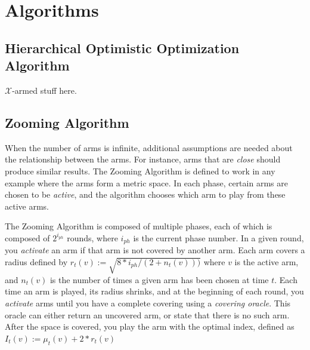 \section{Algorithms}
\subsection{Hierarchical Optimistic Optimization Algorithm}
$\mathcal{X}$-armed stuff here.

\subsection{Zooming Algorithm}
When the number of arms is infinite, additional assumptions are needed
about the relationship between the arms. For instance, arms
that are \emph{close} should produce similar results. The Zooming
Algorithm is defined to work in any example where the arms form a
metric space. In each phase, certain arms are chosen to be
\emph{active}, and the algorithm chooses which arm to play from these
active arms.

The Zooming Algorithm is composed of multiple phases, each of which is
composed of $2^{i_{ph}}$ rounds, where $i_{ph}$ is the current phase
number. In a given round, you \emph{activate} an arm if that arm is
not covered by another arm. Each arm covers a radius defined by
$r_t(v):=\sqrt{8*i_{ph}/(2+n_t(v)))}$ where $v$ is the active arm, and
$n_t(v)$ is the number of times a given arm has been chosen at time
$t$. Each time an arm is played, its radius shrinks, and at the
beginning of each round, you \emph{activate} arms until you have a
complete covering using a \emph{covering oracle}. This oracle can
either return an uncovered arm, or state that there is no such
arm. After the space is covered, you play the arm with the optimal
index, defined as $I_t(v):=\mu_t(v)+2*r_t(v)$

